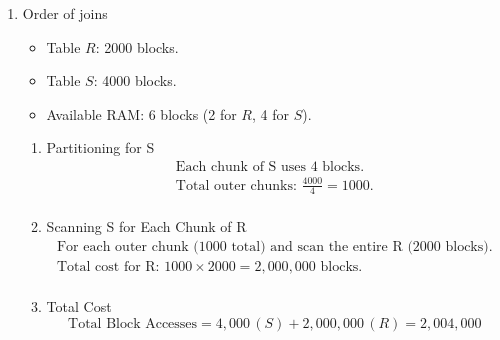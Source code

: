 \documentclass[12pt]{extarticle}
\begin{document}
\begin{flushleft}
\begin{enumerate}
\begin{enumerate}
\end{enumerate}

\item Order of joins
\begin{itemize}
    \item Table \( R \): 2000 blocks.
    \item Table \( S \): 4000 blocks.
    \item Available RAM: 6 blocks (2 for \( R \), 4 for \( S \)).
\end{itemize}

\begin{enumerate}

\item Partitioning for S
\begin{align*}
    \text {Each chunk of S uses 4 blocks.} \\
    \text{Total outer chunks: } \frac{4000}{4} = 1000. \\
\end{align*}


\item Scanning S for Each Chunk of R
\begin{align*}
    \text {For each outer chunk (1000 total) and scan the entire R (2000 blocks).} \\
    \text{Total cost for R: } 1000 \times 2000 = 2,000,000 \text{ blocks.} \\
\end{align*}

\item Total Cost
\[
\text{Total Block Accesses} = 4,000 \,(S) + 2,000,000 \, (R) = \boxed{2,004,000}
\]
\end{enumerate}

\end{enumerate}
\end{flushleft}
\end{document}

